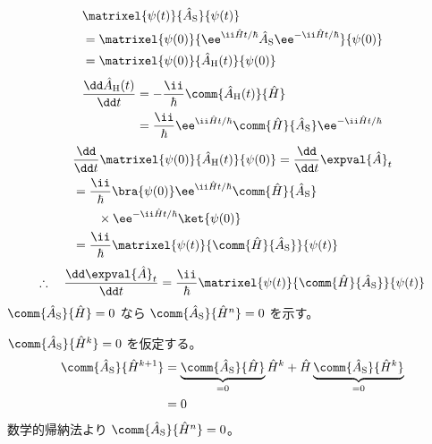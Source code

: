 \begin{align*}
&\matrixel{\psi(t)}{\hat{A}_{\mathrm{S}}}{\psi(t)}\\
&=\matrixel{\psi(0)}{\ee^{\ii\hat{H}t/\hbar}\hat{A}_{\mathrm{S}}\ee^{-\ii\hat{H}t/\hbar}}{\psi(0)}\\
&=\matrixel{\psi(0)}{\hat{A}_{\mathrm{H}}(t)}{\psi(0)}
\end{align*}
\begin{align*}
\frac{\dd\hat{A}_{\mathrm{H}}(t)}{\dd t}&=-\frac{\ii}{\hbar}\comm{\hat{A}_{\mathrm{H}}(t)}{\hat{H}}\\
&=\frac{\ii}{\hbar}\ee^{\ii\hat{H}t/\hbar}\comm{\hat{H}}{\hat{A}_{\mathrm{S}}}\ee^{-\ii\hat{H}t/\hbar}
\end{align*}
\begin{align*}
&\frac{\dd}{\dd t}\matrixel{\psi(0)}{\hat{A}_{\mathrm{H}}(t)}{\psi(0)}=\frac{\dd}{\dd t}\expval{\hat{A}}_{t}\\
&=\frac{\ii}{\hbar}\bra{\psi(0)}\ee^{\ii\hat{H}t/\hbar}\comm{\hat{H}}{\hat{A}_{\mathrm{S}}}\\
&\qquad\times\ee^{-\ii\hat{H}t/\hbar}\ket{\psi(0)}\\
&=\frac{\ii}{\hbar}\matrixel{\psi(t)}{\comm{\hat{H}}{\hat{A}_{\mathrm{S}}}}{\psi(t)}
\end{align*}
\[ \therefore\quad\frac{\dd\expval{\hat{A}}_{t}}{\dd t}=\frac{\ii}{\hbar}\matrixel{\psi(t)}{\comm{\hat{H}}{\hat{A}_{\mathrm{S}}}}{\psi(t)} \]
$\comm{\hat{A}_{\mathrm{S}}}{\hat{H}}=0$ なら $\comm{\hat{A}_{\mathrm{S}}}{\hat{H}^{n}}=0$ を示す。

$\comm{\hat{A}_{\mathrm{S}}}{\hat{H}^{k}}=0$ を仮定する。
\begin{align*}
\comm{\hat{A}_{\mathrm{S}}}{\hat{H}^{k+1}}&=\underbrace{\comm{\hat{A}_{\mathrm{S}}}{\hat{H}}}_{=0}\hat{H}^{k}+\hat{H}\underbrace{\comm{\hat{A}_{\mathrm{S}}}{\hat{H}^{k}}}_{=0}\\
&=0
\end{align*}
数学的帰納法より $\comm{\hat{A}_{\mathrm{S}}}{\hat{H}^{n}}=0$。

